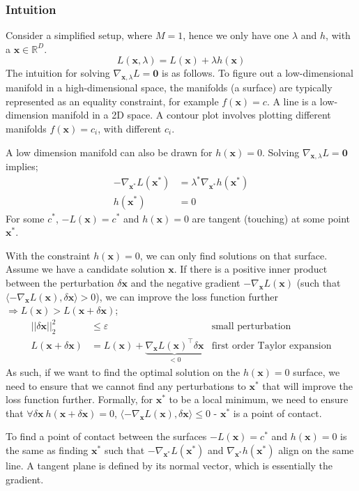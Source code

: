 \documentclass[a4paper, 12pt]{article}
\renewcommand{\vec}[1]{\boldsymbol{#1}}
\newcommand{\la}{\langle}
\newcommand{\ra}{\rangle}
\newcommand{\mbbr}[0]{\mathbb{R}}
\begin{document}
            \subsubsection*{Intuition}
                Consider a simplified setup, where $M = 1$, hence we only have one $\lambda$ and $h$, with a $\vec{x} \in \mbbr^D$.
                $$L(\vec{x}, \lambda) = L(\vec{x}) + \lambda h(\vec{x})$$
                The intuition for solving $\nabla_{\vec{x}, \lambda} L = \vec{0}$ is as follows.
                To figure out a low-dimensional manifold in a high-dimensional space, the manifolds (a surface) are typically represented as an equality constraint, for example $f(\vec{x}) = c$.
                A line is a low-dimension manifold in a 2D space.
                A contour plot involves plotting different manifolds $f(\vec{x}) = c_i$, with different $c_i$.
                \medskip

                A low dimension manifold can also be drawn for $h(\vec{x}) = 0$.
                Solving $\nabla_{\vec{x}, \lambda} L = \vec{0}$ implies;
                \begin{align*}
                    -\nabla_{\vec{x^*}}L(\vec{x^*}) & = \lambda^*\nabla_{\vec{x^*}}h(\vec{x^*}) \\
                    h(\vec{x^*}) & = 0
                \end{align*}
                For some $c^*$, $-L(\vec{x}) = c^*$ and $h(\vec{x}) = 0$ are tangent (touching) at some point $\vec{x^*}$.
                \medskip

                With the constraint $h(\vec{x}) = 0$, we can only find solutions on that surface.
                Assume we have a candidate solution $\vec{x}$.
                If there is a positive inner product between the perturbation $\delta \vec{x}$ and the negative gradient $-\nabla_{\vec{x}}L(\vec{x})$ (such that $\la -\nabla_{\vec{x}}L(\vec{x}), \delta\vec{x} \ra > 0$), we can improve the loss function further $\Rightarrow L(\vec{x}) > L(\vec{x} + \delta\vec{x})$;
                \begin{align*}
                    || \delta \vec{x} ||_2^2 & \leq \varepsilon & \text{small perturbation} \\
                    L(\vec{x} + \delta\vec{x}) & = L(\vec{x}) + \underbrace{\nabla_{\vec{x}}L(\vec{x})^\top \delta\vec{x}}_{< 0} & \text{first order Taylor expansion}
                \end{align*}
                As such, if we want to find the optimal solution on the $h(\vec{x}) = 0$ surface, we need to ensure that we cannot find any perturbations to $\vec{x^*}$ that will improve the loss function further.
                Formally, for $\vec{x^*}$ to be a local minimum, we need to ensure that $\forall \delta\vec{x}\ h(\vec{x} + \delta\vec{x}) = 0$, $\la -\nabla_{\vec{x}}L(\vec{x}), \delta\vec{x} \ra \leq 0$ - $\vec{x^*}$ is a point of contact.
                \medskip

                To find a point of contact between the surfaces $-L(\vec{x}) = c^*$ and $h(\vec{x}) = 0$ is the same as finding $\vec{x^*}$ such that $-\nabla_{\vec{x^*}}L(\vec{x^*})$ and $\nabla_{\vec{x^*}}h(\vec{x^*})$ align on the same line.
                A tangent plane is defined by its normal vector, which is essentially the gradient.
\end{document}
